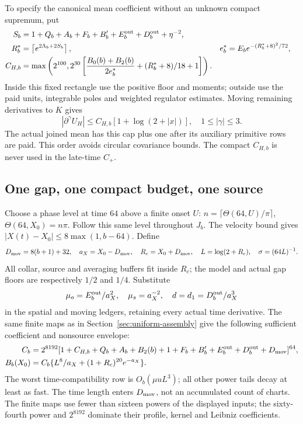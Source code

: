 To specify the canonical mean coefficient without an unknown compact
supremum, put
\begin{align*}
 S_b&=1+Q_b+A_b+F_b+B_b'+E_b^{\rm out}+D_b^{\rm out}+\eta^{-2},\\
 R_b^*&=\left\lceil e^{2\Lambda_b+2S_b}\right\rceil,
 &e_b^*&=E_be^{-(R_b^*+8)^2/72},\\
 C_{H,b}&=\max\left(2^{100},
 2^{30}\left[\frac{B_0(b)+B_2(b)}{2e_b^*}+(R_b^*+8)/18+1\right]\right).
\end{align*}
Inside this fixed rectangle use the positive floor and moments; outside
use the paid units, integrable poles and weighted regulator estimates.
Moving remaining derivatives to $K$ gives
\begin{equation}
 |\partial^\gamma U_H|\le C_{H,b}[1+\log(2+|x|)],\quad1\le|\gamma|\le3.
 \label{eq:at-means}
\end{equation}
The actual joined mean has this cap plus one after its auxiliary
primitive rows are paid. This order avoids circular covariance bounds.
The compact $C_{H,b}$ is never used in the late-time $C_+$.

\subsection{One gap, one compact budget, one source}
Choose a phase level at time $64$ above a finite onset $U$:
$n=\lceil\Theta(64,U)/\pi\rceil$, $\Theta(64,X_0)=n\pi$.
Follow this same level throughout $J_b$. The velocity bound gives
$|X(t)-X_0|\le8\max(1,b-64)$.
Define
\[
 D_{\rm mov}=8(b+1)+32,\quad a_X=X_0-D_{\rm mov},\quad
 R_c=X_0+D_{\rm mov},\quad L=\log(2+R_c),\quad \sigma=(64L)^{-1}.
\]
All collar, source and averaging buffers fit inside $R_c$; the model
and actual gap floors are respectively $1/2$ and $1/4$.
Substitute
\[
 \mu_o=E_b^{\rm out}/a_X^2,\quad\mu_s=a_X^{-2},\quad
 d=d_1=D_b^{\rm out}/a_X^3
\]
in the spatial and moving ledgers, retaining every actual time derivative.
The same finite maps as in Section~\ref{sec:uniform-assembly} give the
following sufficient coefficient and nonsource envelope:
\begin{align}
 C_b={}&2^{8192}
 [1+C_{H,b}+Q_b+A_b+B_2(b)+1+F_b+B_b'
                 +E_b^{\rm out}+D_b^{\rm out}+D_{\rm mov}]^{64},\notag\\
 B_b(X_0)={}&C_b\{L^8/a_X+(1+R_c)^{20}e^{-a_X}\}.
 \label{eq:at-compact-budget}
\end{align}
The worst time-compatibility row is $O_b(\mu uL^3)$; all other power
tails decay at least as fast. The time length enters $D_{\rm mov}$,
not an accumulated count of charts. The finite maps use fewer than
sixteen powers of the displayed inputs; the sixty-fourth power and
$2^{8192}$ dominate their profile, kernel and Leibniz coefficients.

